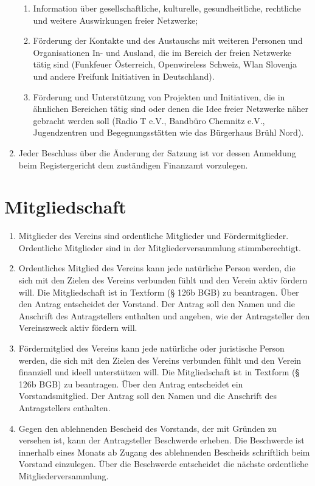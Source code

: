 \documentclass[a4paper,DIV10,12pt,headsepline]{scrartcl}
\begin{document}
\begin{enumerate}
\begin{enumerate}
		\item Information über gesellschaftliche, kulturelle, gesundheitliche, rechtliche und weitere Auswirkungen freier Netzwerke;
		\item Förderung der Kontakte und des Austauschs mit weiteren Personen und Organisationen In- und Ausland, die im Bereich der freien Netzwerke tätig sind (Funkfeuer Österreich, Openwireless Schweiz, Wlan Slovenja und andere Freifunk Initiativen in Deutschland).
		\item Förderung und Unterstützung von Projekten und Initiativen, die in ähnlichen Bereichen tätig sind oder denen die Idee freier Netzwerke näher gebracht werden soll (Radio T e.V., Bandbüro Chemnitz e.V., Jugendzentren und Begegnungsstätten wie das Bürgerhaus Brühl Nord).
	\end{enumerate}	
	\item Jeder Beschluss über die Änderung der Satzung ist vor dessen Anmeldung beim Registergericht dem zuständigen Finanzamt vorzulegen.
\end{enumerate}

\section{Mitgliedschaft}
\begin{enumerate}
	\item Mitglieder des Vereins sind ordentliche Mitglieder und Fördermitglieder. Ordentliche Mitglieder sind in der Mitgliederversammlung stimmberechtigt.
	\item Ordentliches Mitglied des Vereins kann jede natürliche Person werden, die sich mit den Zielen des Vereins verbunden fühlt und den Verein aktiv fördern will. Die Mitgliedschaft ist in Textform (§ 126b BGB) zu beantragen. Über den Antrag entscheidet der Vorstand. Der Antrag soll den Namen und die Anschrift des Antragstellers enthalten und angeben, wie der Antragsteller den Vereinszweck aktiv fördern will.
	\item Fördermitglied des Vereins kann jede natürliche oder juristische Person werden, die sich mit den Zielen des Vereins verbunden fühlt und den Verein finanziell und ideell unterstützen will. Die Mitgliedschaft ist in Textform (§ 126b BGB) zu beantragen. Über den Antrag entscheidet ein Vorstandsmitglied. Der Antrag soll den Namen und die Anschrift des Antragstellers enthalten.
	\item Gegen den ablehnenden Bescheid des Vorstands, der mit Gründen zu versehen ist, kann der Antragsteller Beschwerde erheben. Die Beschwerde ist innerhalb eines Monats ab Zugang des ablehnenden Bescheids schriftlich beim Vorstand einzulegen. Über die Beschwerde entscheidet die nächste ordentliche Mitgliederversammlung.
\end{enumerate}
\end{document}
